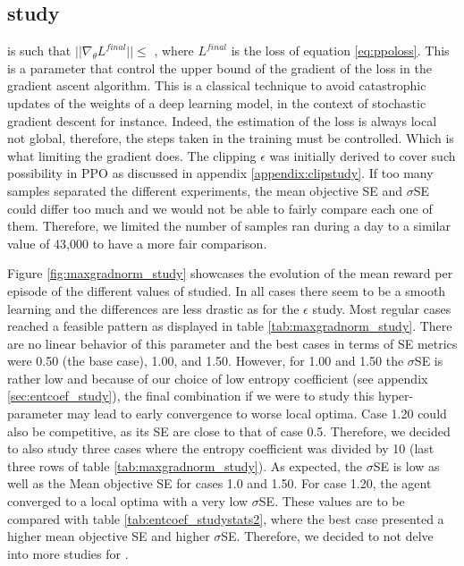 \subsection{ study}
\label{appendix:maxgradnormstudy}

 is such that $||\nabla_{\theta}L^{final}|| \le$ , where $L^{final}$ is the loss of equation \ref{eq:ppoloss}. This is a parameter that control the upper bound of the gradient of the loss in the gradient ascent algorithm. This is a classical technique to avoid catastrophic updates of the weights of a deep learning model, in the context of stochastic gradient descent for instance. Indeed, the estimation of the loss is always local not global, therefore, the steps taken in the training must be controlled. Which is what limiting the gradient does. The clipping $\epsilon$ was initially derived to cover such possibility in PPO \cite{schulman2017proximal} as discussed in appendix \ref{appendix:clipstudy}.  If too many samples separated the different experiments, the mean objective SE and $\sigma$SE could differ too much and we would not be able to fairly compare each one of them. Therefore, we limited the number of samples ran during a day to a similar value of 43,000 to have a more fair comparison.

Figure \ref{fig:maxgradnorm_study} showcases the evolution of the mean reward per episode of the different values of  studied. In all cases there seem to be a smooth learning and the differences are less drastic as for the $\epsilon$ study.  Most regular cases reached a feasible pattern as displayed in table \ref{tab:maxgradnorm_study}. There are no linear behavior of this parameter and the best cases in terms of SE metrics were 0.50 (the base case), 1.00, and 1.50. However, for 1.00 and 1.50 the $\sigma$SE is rather low and because of our choice of low entropy coefficient (see appendix \ref{sec:entcoef_study}), the final combination if we were to study this hyper-parameter may lead to early convergence to worse local optima. Case 1.20 could also be competitive, as its SE are close to that of case 0.5. Therefore, we decided to also study three cases where the entropy coefficient  was divided by 10 (last three rows of table \ref{tab:maxgradnorm_study}). As expected, the $\sigma$SE is low as well as the Mean objective SE for cases 1.0 and 1.50. For case 1.20, the agent converged to a local optima with a very low $\sigma$SE. These values are to be compared with table \ref{tab:entcoef_studystats2}, where the best case presented a higher mean objective SE and higher $\sigma$SE. Therefore, we decided to not delve into more studies for .

